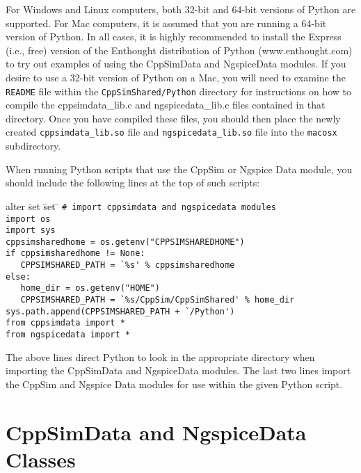 \documentclass [dvips,12pt]{article}
\newcommand{\bt}{\vspace{-.1in} \begin{tabbing} alter \= set \= set \= \kill}
\newcommand{\et}{\end{tabbing} \vspace{-.06in}}
\begin{document}
For Windows and Linux computers, both 32-bit and 64-bit
versions of Python are supported.  For Mac computers, it is assumed that you are
running a 64-bit version of Python. In all cases, it is highly recommended to install 
the Express (i.e., free) version of the Enthought distribution of Python
(www.enthought.com) to try out examples of using the CppSimData and NgspiceData modules. 
If you desire to use a 32-bit version of Python on a Mac, you will
need to examine the \verb|README| file within the \verb|CppSimShared/Python| directory for
instructions on how to compile the cppsimdata\_lib.c and ngspicedata\_lib.c files contained in
that directory.  Once you have compiled these files, you should then
place the newly created \verb|cppsimdata_lib.so| file and \verb|ngspicedata_lib.so| file
into the \verb|macosx| subdirectory.

When running Python scripts that use the CppSim or Ngspice Data module, you should include the following lines at the top of such scripts:

\bt
\> \verb|# import cppsimdata and ngspicedata modules| \\
\> \verb|import os| \\
\> \verb|import sys| \\
\> \verb|cppsimsharedhome = os.getenv("CPPSIMSHAREDHOME")| \\
\> \verb|if cppsimsharedhome != None:| \\
\> \verb|   CPPSIMSHARED_PATH = `%s' % cppsimsharedhome| \\
\> \verb|else:| \\
\> \verb|   home_dir = os.getenv("HOME")| \\
\> \verb|   CPPSIMSHARED_PATH = `%s/CppSim/CppSimShared' % home_dir| \\
\> \verb|sys.path.append(CPPSIMSHARED_PATH + `/Python')| \\
\> \verb|from cppsimdata import *| \\
\> \verb|from ngspicedata import *|
\et

The above lines direct Python to look in the appropriate directory when importing the CppSimData and NgspiceData modules.  The last two lines import the CppSim and Ngspice Data modules for use within the given Python script.

\section*{CppSimData and NgspiceData Classes}
\end{document}
